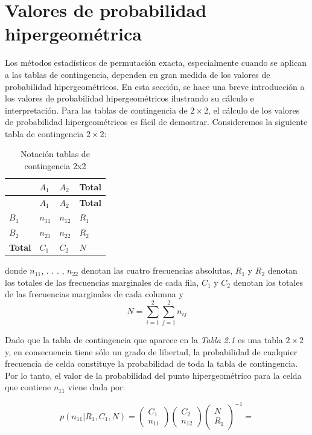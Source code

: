 \documentclass[12pt,a4paper,]{book}
\numberwithin{dummy}{section}
\theoremstyle{ocrenumbox}
\theoremstyle{blacknumex}
\theoremstyle{blacknumbox}
\theoremstyle{ocrenum}
\theoremstyle{ocrenum}
\begin{document}
\hypertarget{valores-de-probabilidad-hipergeomuxe9trica}{%
\section{Valores de probabilidad
hipergeométrica}\label{valores-de-probabilidad-hipergeomuxe9trica}}

Los métodos estadísticos de permutación exacta, especialmente cuando se
aplican a las tablas de contingencia, dependen en gran medida de los
valores de probabilidad hipergeométricos. En esta sección, se hace una
breve introducción a los valores de probabilidad hipergeométricos
ilustrando su cálculo e interpretación. Para las tablas de contingencia
de \(2\times2\), el cálculo de los valores de probabilidad
hipergeométricos es fácil de demostrar. Consideremos la siguiente tabla
de contingencia \(2\times2\):

\begin{longtable}[]{@{}llll@{}}
\caption{Notación tablas de contingencia 2x2}\tabularnewline
\toprule
& \(A_1\) & \(A_2\) & \textbf{Total} \\
\midrule
\endfirsthead
\toprule
& \(A_1\) & \(A_2\) & \textbf{Total} \\
\midrule
\endhead
\(B_1\) & \(n_{11}\) & \(n_{12}\) & \(R_1\) \\
\(B_2\) & \(n_{21}\) & \(n_{22}\) & \(R_2\) \\
\textbf{Total} & \(C_1\) & \(C_2\) & \(N\) \\
\bottomrule
\end{longtable}

donde \(n_{11}\), . . . , \(n_{22}\) denotan las cuatro frecuencias
absolutas, \(R_1\) y \(R_2\) denotan los totales de las frecuencias
marginales de cada fila, \(C_1\) y \(C_2\) denotan los totales de las
frecuencias marginales de cada columna y \[
N=\sum_{i=1}^2\sum_{j=1}^2 n_{ij}
\]

Dado que la tabla de contingencia que aparece en la \emph{Tabla 2.1} es
una tabla \(2\times2\) y, en consecuencia tiene sólo un grado de
libertad, la probabilidad de cualquier frecuencia de celda constituye la
probabilidad de toda la tabla de contingencia. Por lo tanto, el valor de
la probabilidad del punto hipergeométrico para la celda que contiene
\(n_{11}\) viene dada por:

\[
p(n_{11}|R_1,C_1,N)=\left(\begin{array}{c}C_1\\ n_{11}\end{array}\right)\left(\begin{array}{c}C_2\\ n_{12}\end{array}\right)\left(\begin{array}{c}N\\ R_1\end{array}\right)^{-1}=
\]
\end{document}
